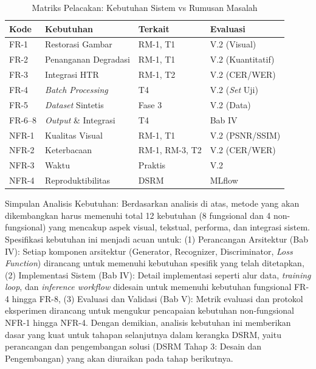\begin{table}[htbp!]
    \centering
    \small
    \caption{Matriks Pelacakan: Kebutuhan Sistem vs Rumusan Masalah}
    \label{tab:traceability-matrix}
    \begin{tabular}{p{}p{}p{}p{}}
        \toprule
        \textbf{Kode} & \textbf{Kebutuhan}   & \textbf{Terkait} & \textbf{Evaluasi}   \\
        \midrule
        FR-1          & Restorasi Gambar     & RM-1, T1         & V.2 (Visual)        \\
        \midrule
        FR-2          & Penanganan Degradasi & RM-1, T1         & V.2 (Kuantitatif)   \\
        \midrule
        FR-3          & Integrasi HTR        & RM-1, T2         & V.2 (CER/WER)       \\
        \midrule
        FR-4          & \textit{Batch Processing}     & T4               & V.2 (\textit{Set} Uji)       \\
        \midrule
        FR-5          & \textit{Dataset} Sintetis     & Fase 3           & V.2 (Data)          \\
        \midrule
        FR-6--8       & \textit{Output} \& Integrasi  & T4               & Bab IV              \\
        \midrule
        NFR-1         & Kualitas Visual      & RM-1, T1         & V.2 (PSNR/SSIM)     \\
        \midrule
        NFR-2         & Keterbacaan          & RM-1, RM-3, T2   & V.2 (CER/WER)       \\
        \midrule
        NFR-3         & Waktu                & Praktis          & V.2\footnotemark[1] \\
        \midrule
        NFR-4         & Reproduktibilitas      & DSRM             & MLflow              \\
        \bottomrule
    \end{tabular}
\end{table}


Simpulan Analisis Kebutuhan: Berdasarkan analisis di atas, metode yang akan dikembangkan harus memenuhi total 12 kebutuhan (8 fungsional dan 4 non-fungsional) yang mencakup aspek visual, tekstual, performa, dan integrasi sistem. Spesifikasi kebutuhan ini menjadi acuan untuk: (1) Perancangan Arsitektur (Bab IV): Setiap komponen arsitektur (Generator, Recognizer, Discriminator, \textit{Loss Function}) dirancang untuk memenuhi kebutuhan spesifik yang telah ditetapkan, (2) Implementasi Sistem (Bab IV): Detail implementasi seperti alur data, \textit{training loop}, dan \textit{inference workflow} didesain untuk memenuhi kebutuhan fungsional FR-4 hingga FR-8, (3) Evaluasi dan Validasi (Bab V): Metrik evaluasi dan protokol eksperimen dirancang untuk mengukur pencapaian kebutuhan non-fungsional NFR-1 hingga NFR-4. Dengan demikian, analisis kebutuhan ini memberikan dasar yang kuat untuk tahapan selanjutnya dalam kerangka DSRM, yaitu perancangan dan pengembangan solusi (DSRM Tahap 3: Desain dan Pengembangan) yang akan diuraikan pada tahap berikutnya.

